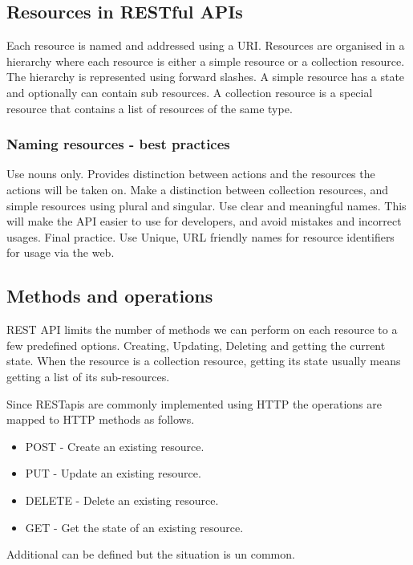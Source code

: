 \documentclass[a4paper, 11pt]{book}
\begin{document}
    \subsection{Resources in RESTful APIs}
    Each resource is named and addressed using a URI.
    Resources are organised in a hierarchy where each resource is either a simple resource or a collection resource.
    The hierarchy is represented using forward slashes.
    A simple resource has a state and optionally can contain sub resources.
    A collection resource is a special resource that contains a list of resources of the same type.

    \subsubsection{Naming resources - best practices}
    Use nouns only.
    Provides distinction between actions and the resources the actions will be taken on.
    Make a distinction between collection resources, and simple resources using plural and singular.
    Use clear and meaningful names.
    This will make the API easier to use for developers, and avoid mistakes and incorrect usages.
    Final practice.
    Use Unique, URL friendly names for resource identifiers for usage via the web.

    \subsection{Methods and operations}
    REST API limits the number of methods we can perform on each resource to a few predefined options.
    Creating, Updating, Deleting and getting the current state.
    When the resource is a collection resource, getting its state usually means getting a list of its sub-resources.

    Since RESTapis are commonly implemented using HTTP the operations are mapped to HTTP methods as follows.

    \begin{itemize}
        \item POST - Create an existing resource.
        \item PUT - Update an existing resource.
        \item DELETE - Delete an existing resource.
        \item GET - Get the state of an existing resource.
    \end{itemize}

    Additional can be defined but the situation is un common.
\end{document}

